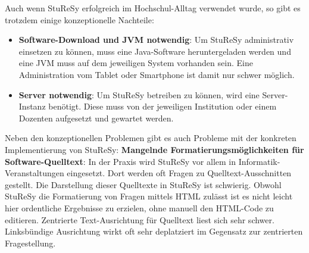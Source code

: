 Auch wenn StuReSy erfolgreich im Hochschul-Alltag verwendet wurde, so gibt es trotzdem einige konzeptionelle Nachteile:
\begin{itemize}
    \item \textbf{Software-Download und JVM notwendig}: Um StuReSy administrativ einsetzen zu können, muss eine Java-Software heruntergeladen werden und eine JVM muss auf dem jeweiligen System vorhanden sein. Eine Administration vom Tablet oder Smartphone ist damit nur schwer möglich.
    \item \textbf{Server notwendig}: Um StuReSy betreiben zu können, wird eine Server-Instanz benötigt. Diese muss von der jeweiligen Institution oder einem Dozenten aufgesetzt und gewartet werden.
\end{itemize}

Neben den konzeptionellen Problemen gibt es auch Probleme mit der konkreten Implementierung von StuReSy:\newline
\textbf{Mangelnde Formatierungsmöglichkeiten für Software-Quelltext}: In der Praxis wird StuReSy vor allem in Informatik-Veranstaltungen eingesetzt. Dort werden oft Fragen zu Quelltext-Ausschnitten gestellt. Die Darstellung dieser Quelltexte in StuReSy ist schwierig. Obwohl StuReSy die Formatierung von Fragen mittels HTML zulässt ist es nicht leicht hier ordentliche Ergebnisse zu erzielen, ohne manuell den HTML-Code zu editieren. Zentrierte Text-Ausrichtung für Quelltext liest sich sehr schwer. Linksbündige Ausrichtung wirkt oft sehr deplatziert im Gegensatz zur zentrierten Fragestellung.
